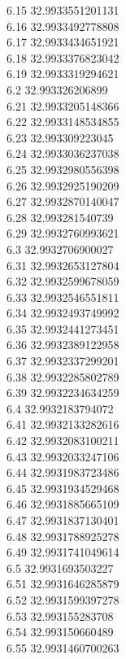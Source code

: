 {6.15	32.9933551201131\\
6.16	32.9933492778808\\
6.17	32.9933434651921\\
6.18	32.9933376823042\\
6.19	32.9933319294621\\
6.2	32.993326206899\\
6.21	32.9933205148366\\
6.22	32.9933148534855\\
6.23	32.993309223045\\
6.24	32.9933036237038\\
6.25	32.9932980556398\\
6.26	32.9932925190209\\
6.27	32.9932870140047\\
6.28	32.993281540739\\
6.29	32.9932760993621\\
6.3	32.9932706900027\\
6.31	32.9932653127804\\
6.32	32.9932599678059\\
6.33	32.9932546551811\\
6.34	32.9932493749992\\
6.35	32.9932441273451\\
6.36	32.9932389122958\\
6.37	32.9932337299201\\
6.38	32.9932285802789\\
6.39	32.9932234634259\\
6.4	32.9932183794072\\
6.41	32.9932133282616\\
6.42	32.9932083100211\\
6.43	32.9932033247106\\
6.44	32.9931983723486\\
6.45	32.9931934529468\\
6.46	32.9931885665109\\
6.47	32.9931837130401\\
6.48	32.9931788925278\\
6.49	32.9931741049614\\
6.5	32.9931693503227\\
6.51	32.9931646285879\\
6.52	32.9931599397278\\
6.53	32.993155283708\\
6.54	32.993150660489\\
6.55	32.9931460700263\\
}

